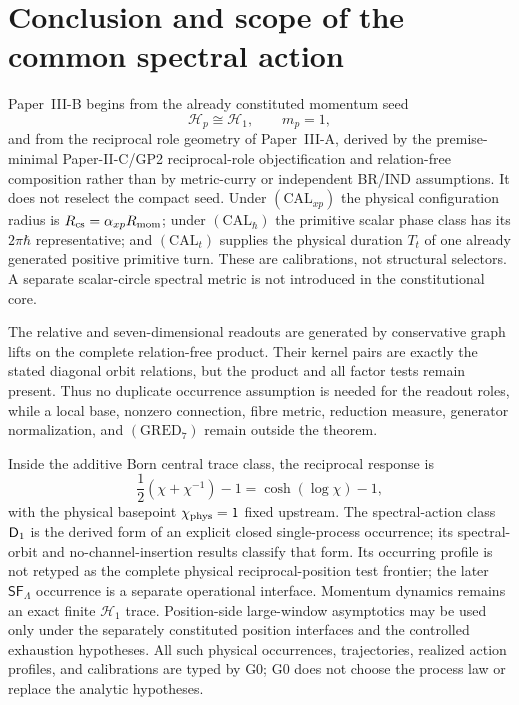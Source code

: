 \documentclass[12pt,a4paper]{article}
\begin{document}
\section{Conclusion and scope of the common spectral action}
\label{paper3b:sec:organized-conclusion}
\label{p3b:sec:conclusion}
Paper~III-B begins from the already constituted momentum seed
\[
 \mathcal H_p\cong\mathcal H_1,
 \qquad
 m_p=1,
\]
and from the reciprocal role geometry of Paper~III-A, derived by the
premise-minimal Paper-II-C/GP2 reciprocal-role objectification and
relation-free composition rather than by metric-curry or independent BR/IND
assumptions.  It does not reselect the compact seed.  Under
\((\mathrm{CAL}_{xp})\) the physical configuration radius is
\(R_{\mathrm{cs}}=\alpha_{xp}R_{\mathrm{mom}}\); under \((\mathrm{CAL}_{\hbar})\) the primitive
scalar phase class has its \(2\pi\hbar\) representative; and
\((\mathrm{CAL}_{t})\) supplies the physical duration \(T_t\) of one already
generated positive primitive turn.  These are calibrations, not structural
selectors.  A separate scalar-circle spectral metric is not introduced in
the constitutional core.

The relative and seven-dimensional readouts are generated by conservative
graph lifts on the complete relation-free product.  Their kernel pairs are
exactly the stated diagonal orbit relations, but the product and all factor
tests remain present.  Thus no duplicate occurrence assumption is needed for
the readout roles, while a local base, nonzero connection, fibre metric,
reduction measure, generator normalization, and \((\mathrm{GRED}_7)\) remain
outside the theorem.

Inside the additive Born central trace class, the reciprocal response is
\[
 \frac12(\chi+\chi^{-1})-1=\cosh(\log\chi)-1,
\]
with the physical basepoint \(\chi_{\rm phys}=1\) fixed upstream.  The
spectral-action class \(\mathsf{D}_1\) is the derived form of an explicit closed
single-process occurrence; its spectral-orbit and no-channel-insertion
results classify that form.  Its occurring profile is not retyped as the
complete physical reciprocal-position test frontier; the later
\(\mathsf{SF}_\Lambda\) occurrence is a separate operational interface.
Momentum dynamics remains an exact finite \(\mathcal H_1\) trace.
Position-side large-window asymptotics may be used only under the separately
constituted position interfaces and the controlled exhaustion hypotheses.
All such physical occurrences, trajectories, realized action profiles, and
calibrations are typed by G0; G0 does not choose the process law or replace
the analytic hypotheses.
\end{document}

